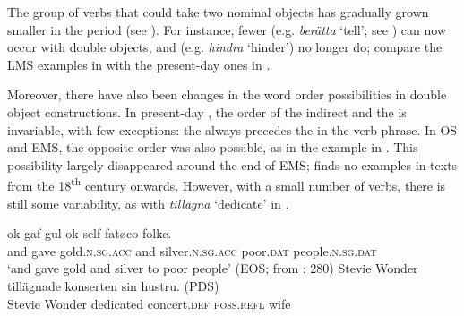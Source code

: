 \documentclass[output=paper]{langscibook}
\begin{document}
The group of verbs that could take two nominal objects has gradually grown smaller in the  period (see \citealt{Valdeson2017}). For instance, fewer  (e.g. \textit{berätta} ‘tell’; see \citealt{Silen2005}) can now occur with double objects, and  (e.g. \textit{hindra} ‘hinder’) no longer do; compare the LMS examples in  with the present-day  ones in .


\ea\label{ex:intro:24}

\z
\ex \label{ex:intro:25}

\z
\z

Moreover, there have also been changes in the word order possibilities in double object constructions. In present-day , the order of the indirect and the  is invariable, with few exceptions: the  always precedes the  in the verb phrase. In OS and EMS, the opposite order was also possible, as in the example in . This possibility largely disappeared around the end of EMS; \citet{Valdeson2016} finds no examples in texts from the 18\textsuperscript{th} century onwards. However, with a small number of verbs, there is still some variability, as with \textit{tillägna} ‘dedicate’ in .


\ea\label{ex:intro:26}
\gll  ok   gaf   gul             ok   self           fatøco     folke. \\
  and gave   gold\textsc{.n.sg.acc}   and  silver\textsc{.n.sg.acc}   poor\textsc{.dat}   people\textsc{.n.sg.dat}\\
    \glt `and gave gold and silver to poor people’ (EOS; from \citealt{Valdeson2016}: 280)
\ex\label{ex:intro:27}
\ea
\gll  Stevie Wonder   tillägnade konserten     sin         hustru. (PDS)\\
Stevie Wonder  dedicated  concert.\textsc{def}     \textsc{poss.refl}  wife  \\
\end{document}
